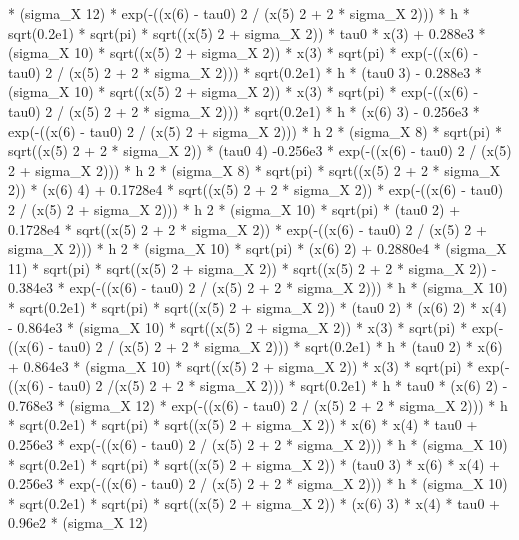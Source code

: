 \begin{maplegroup}
* (sigma\_X  12) * exp(-((x(6) - tau0)  2 / (x(5)  2 + 2 * sigma\_X  2))) * h * sqrt(0.2e1) * sqrt(pi) * sqrt((x(5)  2 + sigma\_X  2)) * tau0 * x(3) + 0.288e3 * (sigma\_X  10) * sqrt((x(5)  2 + sigma\_X  2)) * x(3) * sqrt(pi) * exp(-((x(6) - tau0)  2 / (x(5)  2 + 2 * sigma\_X  2))) * sqrt(0.2e1) * h * (tau0  3) - 0.288e3 * (sigma\_X  10) * sqrt((x(5)  2 + sigma\_X  2)) * x(3) * sqrt(pi) * exp(-((x(6) - tau0)  2 / (x(5)  2 + 2 * sigma\_X  2))) * sqrt(0.2e1) * h * (x(6)  3) - 0.256e3 * exp(-((x(6) - tau0)  2 / (x(5)  2 + sigma\_X  2))) * h  2 * (sigma\_X  8) * sqrt(pi) * sqrt((x(5)  2 + 2 * sigma\_X  2)) * (tau0  4) -0.256e3 * exp(-((x(6) - tau0)  2 / (x(5)  2 + sigma\_X  2))) * h  2 * (sigma\_X  8) * sqrt(pi) * sqrt((x(5)  2 + 2 * sigma\_X  2)) * (x(6)  4) + 0.1728e4 * sqrt((x(5)  2 + 2 * sigma\_X  2)) * exp(-((x(6) - tau0)  2 / (x(5)  2 + sigma\_X  2))) * h 2 * (sigma\_X  10) * sqrt(pi) * (tau0  2) + 0.1728e4 * sqrt((x(5)  2 + 2 * sigma\_X  2)) * exp(-((x(6) - tau0)  2 / (x(5)  2 + sigma\_X  2))) * h  2 * (sigma\_X  10) * sqrt(pi) * (x(6)  2) + 0.2880e4 * (sigma\_X  11) * sqrt(pi) * sqrt((x(5)  2 + sigma\_X  2)) * sqrt((x(5)  2 + 2 * sigma\_X  2)) - 0.384e3 * exp(-((x(6) - tau0)  2 / (x(5)  2 + 2 * sigma\_X  2))) * h * (sigma\_X  10) * sqrt(0.2e1) * sqrt(pi) * sqrt((x(5)  2 + sigma\_X  2)) * (tau0  2) * (x(6)  2) * x(4) - 0.864e3 * (sigma\_X  10) * sqrt((x(5)  2 + sigma\_X  2)) * x(3) * sqrt(pi) * exp(-((x(6) - tau0)  2 / (x(5)  2 + 2 * sigma\_X  2))) * sqrt(0.2e1) * h * (tau0  2) * x(6) + 0.864e3 * (sigma\_X  10) * sqrt((x(5)  2 + sigma\_X  2)) * x(3) * sqrt(pi) * exp(-((x(6) - tau0)  2 /(x(5)  2 + 2 * sigma\_X  2))) * sqrt(0.2e1) * h * tau0 * (x(6)  2) - 0.768e3 * (sigma\_X  12) * exp(-((x(6) - tau0)  2 / (x(5)  2 + 2 * sigma\_X  2))) * h * sqrt(0.2e1) * sqrt(pi) * sqrt((x(5)  2 + sigma\_X  2)) * x(6) * x(4) * tau0 + 0.256e3 * exp(-((x(6) - tau0)  2 / (x(5)  2 + 2 * sigma\_X  2))) * h * (sigma\_X  10) * sqrt(0.2e1) * sqrt(pi) * sqrt((x(5)  2 + sigma\_X  2)) * (tau0  3) * x(6) * x(4) + 0.256e3 * exp(-((x(6) - tau0)  2 / (x(5)  2 + 2 * sigma\_X  2))) * h * (sigma\_X  10) * sqrt(0.2e1) * sqrt(pi) * sqrt((x(5)  2 + sigma\_X  2)) * (x(6)  3) * x(4) * tau0 + 0.96e2 * (sigma\_X  12) 
\end{maplegroup}
